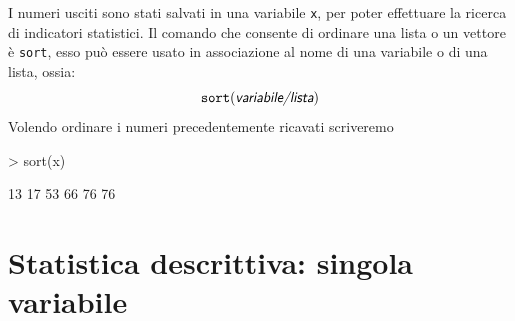 \documentclass[onecolumn,11pt]{book}
\newcommand{\varia}[1]{\textsl{\textsf{#1}}}
\begin{document}
 I numeri usciti sono stati salvati  in una variabile \texttt{x}, per poter effettuare la ricerca di indicatori statistici.
Il comando che consente di ordinare una lista o un vettore \`e \texttt{sort}, esso pu\`o essere usato in associazione al nome di una variabile o di una lista, ossia:
\begin{equation}\texttt{sort}(\varia{variabile/lista})\end{equation}
Volendo ordinare i numeri precedentemente ricavati scriveremo
\begin{Schunk}
\begin{Sinput}
> sort(x)
\end{Sinput}
\begin{Soutput}
[1] 13 17 53 66 76 76
\end{Soutput}
\end{Schunk}


 
\section{Statistica descrittiva: singola variabile}
\end{document}

